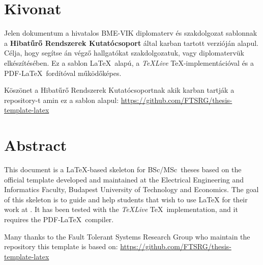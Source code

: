 \setcounter{page}{1}

\selecthungarian

\chapter*{Kivonat}

Jelen dokumentum a hivatalos BME-VIK diplomaterv és szakdolgozat sablonnak a \textbf{Hibatűrő Rendszerek Kutatócsoport} által karban tartott verzióján alapul. Célja, hogy segítse \sze{} \givk án végző hallgatókat szakdolgozatuk, vagy diplomatervük elkészítésében. Ez a sablon \LaTeX~alapú, a \emph{TeXLive} \TeX-implementációval és a PDF-\LaTeX~fordítóval működőképes. 

Köszönet a Hibatűrő Rendszerek Kutatócsoportnak akik karban tartják a repository-t amin ez a sablon alapul:
\url{https://github.com/FTSRG/thesis-template-latex}


\vfill
\selectenglish


\chapter*{Abstract}

This document is a \LaTeX-based skeleton for BSc/MSc~theses based on the official template developed and maintained at the Electrical Engineering and Informatics Faculty, Budapest University of Technology and Economics. The goal of this skeleton is to guide and help students that wish to use \LaTeX{} for their work at \sze{} \givk. It has been tested with the \emph{TeXLive} \TeX~implementation, and it requires the PDF-\LaTeX~compiler.

Many thanks to the Fault Tolerant Systems Research Group who maintain the repository this template is based on: \url{https://github.com/FTSRG/thesis-template-latex}


\vfill
\selectthesislanguage

\setcounter{romanPage}{\value{page}}
